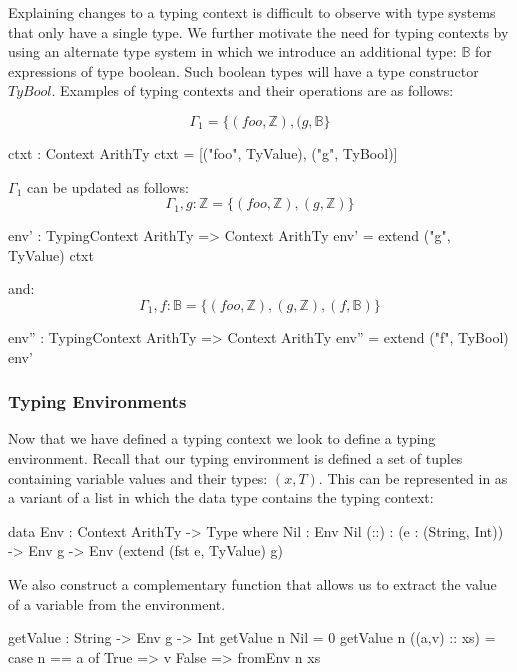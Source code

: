 Explaining changes to a typing context is difficult to observe with type systems that only have a single type.
We further motivate the need for typing contexts by using an alternate type system in which we introduce an additional type: $\mathbb{B}$ for expressions of type boolean.
Such boolean types will have a type constructor $TyBool$.
Examples of typing contexts and their operations are as follows:

\[
\Gamma_{1}=\{(foo,\mathbb{Z}),(g,\mathbb{B}\}
\]

\begin{code}
ctxt : Context ArithTy
ctxt = [("foo", TyValue), ("g", TyBool)]
\end{code}

\noindent
$\Gamma_{1}$ can be updated as follows:
\[
\Gamma_{1},g:\mathbb{Z} =\{(foo,\mathbb{Z}),(g,\mathbb{Z})\}
\]
\begin{code}
env' : TypingContext ArithTy => Context ArithTy
env' = extend ("g", TyValue) ctxt
\end{code}
\noindent
and:
\[
\Gamma_{1},f:\mathbb{B}=\{(foo,\mathbb{Z}),(g,\mathbb{Z}),(f,\mathbb{B})\}
\]
\begin{code}
env'' : TypingContext ArithTy => Context ArithTy
env'' = extend ("f", TyBool) env'
\end{code}

\subsubsection{Typing Environments }
\label{sec:typed-arith-var:environments}

Now that we have defined a typing context we look to define a typing environment.
Recall that our typing environment is defined a set of tuples containing variable values and their types: $(x,T)$.
This can be represented in \idris{} as a variant of a list in which the data type contains the typing context:

\begin{code}
data Env : Context ArithTy -> Type where
  Nil  : Env Nil
  (::) : (e : (String, Int)) -> Env g
       -> Env (extend (fst e, TyValue) g)
\end{code}

\noindent
We also construct a complementary function that allows us to extract the value of a variable from the environment.

\begin{code}
getValue : String -> Env g -> Int
getValue n Nil           = 0
getValue n ((a,v) :: xs) = case n == a of
  True => v
  False => fromEnv n xs
\end{code}

